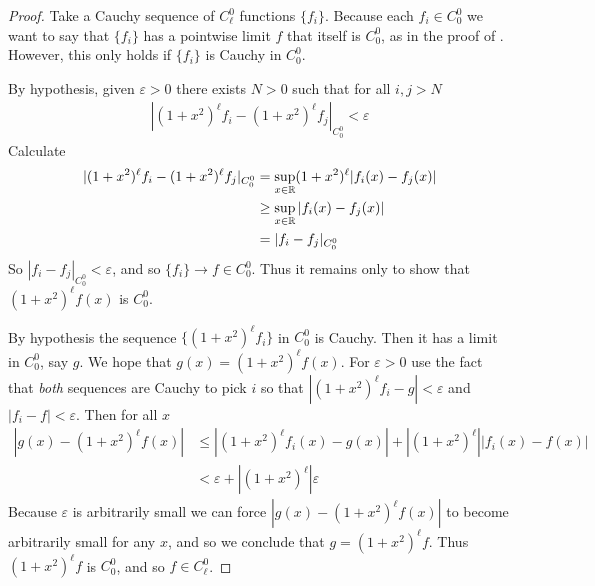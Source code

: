       \begin{proof}
        Take a Cauchy sequence of $C^0_\ell$ functions $\{f_i\}$.
        Because each $f_i\in C^0_0$ we want to say that $\{f_i\}$ has a pointwise limit $f$ that itself is $C^0_0$, as in the proof of .
        However, this only holds if $\{f_i\}$ is Cauchy in $C^0_0$. 

        By hypothesis, given $\varepsilon>0$ there exists $N>0$ such that for all $i,j>N$
        \begin{align*}
          |(1+x^2)^\ell f_i - (1+x^2)^\ell f_j|_{C^0_0} < \varepsilon
        \end{align*}
        Calculate 
        \begin{align*}
          |(1+x^2)^\ell f_i - (1+x^2)^\ell f_j|_{C^0_0}
          &= \sup_{x\in\mathbb{R}}(1+x^2)^\ell|f_i(x)-f_j(x)|\\
          &\ge \sup_{x\in\mathbb{R}}|f_i(x)-f_j(x)|\\
          &= |f_i-f_j|_{C^0_0}
        \end{align*}
        So $|f_i-f_j|_{C^0_0}<\varepsilon$, and so $\{f_i\}\rightarrow f\in C^0_0$.
        Thus it remains only to show that $(1+x^2)^\ell f(x)$ is $C^0_0$.
        
        By hypothesis the sequence $\{(1+x^2)^\ell f_i\}$ in $C^0_0$ is Cauchy.
        Then it has a limit in $C^0_0$, say $g$.
        We hope that $g(x)=(1+x^2)^\ell f(x)$.
        For $\varepsilon>0$ use the fact that \emph{both} sequences are Cauchy to pick $i$ so that $|(1+x^2)^\ell f_i - g|<\varepsilon$ and $|f_i - f|<\varepsilon$.
        Then for all $x$ 
        \begin{align*}
          |g(x) - (1+x^2)^\ell f(x)| &\le |(1+x^2)^\ell f_i(x) - g(x)|+|(1+x^2)^\ell||f_i(x)-f(x)|\\
          &< \varepsilon + |(1+x^2)^\ell|\varepsilon
        \end{align*}
        Because $\varepsilon$ is arbitrarily small we can force $|g(x)-(1+x^2)^\ell f(x)|$ to become arbitrarily small for any $x$, and so we conclude that $g=(1+x^2)^\ell f$.
        Thus $(1+x^2)^\ell f$ is $C^0_0$, and so $f\in C^0_\ell$.
      \end{proof}

